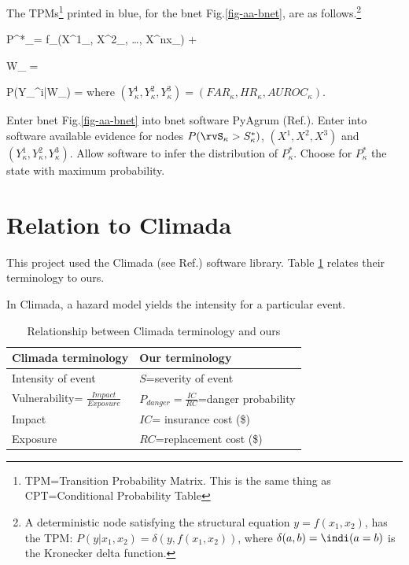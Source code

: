 \documentclass[12pt]{article}
\begin{document}
The TPMs\footnote{TPM=Transition
Probability Matrix.
This is the same thing
as CPT=Conditional Probability Table
} printed in blue, for the
bnet Fig.\ref{fig-aa-bnet}, are
as follows.\footnote{
A deterministic node satisfying
the structural equation $y=f(x_1, x_2)$,
has the TPM: $P(y|x_1, x_2)=
\delta(y, f(x_1, x_2))
$, where 
$\delta(a,b)=\indi(a=b)$ is the Kronecker delta function. }



\beq\color{blue}
P^*_\kappa =
f_\kappa(X^1_\kappa, X^2_\kappa,
\ldots, X^{nx}_\kappa) + \eps 
\eeq

\beq\color{blue}
W_\kappa
=
\eeq

\beq\color{blue}
P(Y_\kappa^i|W_\kappa)
= 
\eeq
where $(Y_\kappa^1, Y_\kappa^2, Y_\kappa^3) =
(FAR_\kappa, HR_\kappa,
AUROC_\kappa)$.

\begin{mdframed}[hidealllines=true,backgroundcolor=blue!10]

Enter bnet Fig.\ref{fig-aa-bnet} into bnet software
PyAgrum
(Ref.\cite{pyagrum}).
Enter into software available
evidence for
nodes $P(\rvS_\kappa> S^*_\kappa)$, $(X^1, X^2, X^3)$
and $(Y_\kappa^1, Y_\kappa^2,Y_\kappa^3)$.
Allow software
to
infer the 
distribution of 
$P^*_\kappa$.
Choose for
$P^*_\kappa$
the state
with maximum 
probability. 
\end{mdframed}

\section{Relation to Climada}

This project used the Climada (see Ref.\cite{climada}) software library.
Table \ref{tab-climada} relates their 
terminology to ours.

In Climada, a hazard model 
yields the intensity
for a particular event.


\begin{table}[h!]
\begin{tabular}{|l|l|}
\hline
\rowcolor[HTML]{FFFFC7} 
Climada terminology & Our terminology \\ \hline
Intensity of event & $S$=severity of event  \\ \hline
Vulnerability=
$\frac{Impact}{Exposure}$ & $P_{danger}= \frac{IC}{RC}$=danger probability \\ \hline
Impact & $IC$= insurance cost (\$) \\ \hline
Exposure & $RC$=replacement cost (\$) \\ \hline
\end{tabular}
\caption{Relationship between Climada terminology and ours}
\label{tab-climada}
\end{table}
\end{document}
